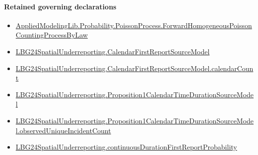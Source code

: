 \documentclass[10pt]{article}
\begin{document}
\paragraph{Retained governing declarations}
\begin{itemize}\raggedright
\item \hyperlink{library-prerequisite-fb517e3d857fbe00}{Applied\allowbreak{}Modeling\allowbreak{}Lib.\allowbreak{}Probability.\allowbreak{}Poisson\allowbreak{}Process.\allowbreak{}Forward\allowbreak{}Homogeneous\allowbreak{}Poisson\allowbreak{}Counting\allowbreak{}Process\allowbreak{}By\allowbreak{}Law}
\item \hyperlink{paper-prerequisite-8b45cca115cdd2d8}{LBG24\allowbreak{}Spatial\allowbreak{}Underreporting.\allowbreak{}Calendar\allowbreak{}First\allowbreak{}Report\allowbreak{}Source\allowbreak{}Model}
\item \hyperlink{governing-declaration-2cd146635f1d1568}{LBG24\allowbreak{}Spatial\allowbreak{}Underreporting.\allowbreak{}Calendar\allowbreak{}First\allowbreak{}Report\allowbreak{}Source\allowbreak{}Model.\allowbreak{}calendar\allowbreak{}Count}
\item \hyperlink{paper-prerequisite-12e4cb02af85f9fa}{LBG24\allowbreak{}Spatial\allowbreak{}Underreporting.\allowbreak{}Proposition1\allowbreak{}Calendar\allowbreak{}Time\allowbreak{}Duration\allowbreak{}Source\allowbreak{}Model}
\item \hyperlink{governing-declaration-e3e50d59eb5c2d2a}{LBG24\allowbreak{}Spatial\allowbreak{}Underreporting.\allowbreak{}Proposition1\allowbreak{}Calendar\allowbreak{}Time\allowbreak{}Duration\allowbreak{}Source\allowbreak{}Model.\allowbreak{}observed\allowbreak{}Unique\allowbreak{}Incident\allowbreak{}Count}
\item \hyperlink{governing-declaration-d32ae891cc2a6d88}{LBG24\allowbreak{}Spatial\allowbreak{}Underreporting.\allowbreak{}continuous\allowbreak{}Duration\allowbreak{}First\allowbreak{}Report\allowbreak{}Probability}
\end{itemize}
\end{document}
